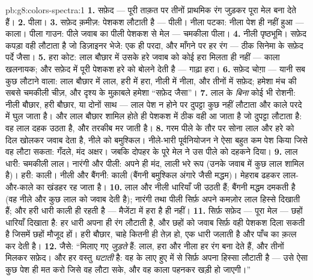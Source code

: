 \begin{solution}{pb:g8:colors-spectra:1}
\textbf{1.} सफ़ेद --- पूरी ताक़त पर तीनों प्राथमिक रंग जुड़कर पूरा मेल
बना देते हैं।
\textbf{2.} पीला।
\textbf{3.} सफ़ेद क़मीज़: पेशकश लौटाती है --- पीली। नीला पटका: नीला
पेश ही नहीं हुआ --- काला। पीला गाउन: पीले जवाब का पीली पेशकश से मेल
--- चमकीला पीला।
\textbf{4.} नीली पृष्ठभूमि। सफ़ेद कपड़ा वही लौटाता है जो डिज़ाइनर
भेजे: एक ही परदा, और माँगने पर हर रंग --- ठीक सिनेमा के सफ़ेद पर्दे
जैसा।
\textbf{5.} हरा कोट: लाल बौछार में उसके हरे जवाब को कोई हरा मिलता ही
नहीं --- काला खलनायक; और सफ़ेद  में पूरी पेशकश हरे को बोलने देती
है --- गाढ़ा हरा।
\textbf{6.} सफ़ेद चोग़ा --- यानी सब कुछ लौटाने वाला: लाल बौछार में
लाल, हरी में हरा, नीली में नीला, और तीनों में सफ़ेद; हमेशा मंच की सबसे
चमकीली चीज़, और दृश्य के मुक़ाबले हमेशा ``सफ़ेद जैसा''।
\textbf{7.} लाल के \emph{बिना} कोई भी रोशनी: नीली बौछार, हरी बौछार,
या दोनों साथ --- लाल पेश न होने पर दुपट्टा कुछ नहीं लौटाता और काले
परदे में घुल जाता है। और लाल बौछार शामिल होते ही पेशकश में ठीक वही आ
जाता है जो दुपट्टा लौटाता है: वह लाल दहक उठता है, और तरकीब मर जाती है।
\textbf{8.} गरम पीले के तौर पर सोना लाल और हरे को दिल खोलकर जवाब देता
है, नीले को बमुश्किल। नीले-भारी पूर्वनियोजन ने ऐसा बहुत कम पेश किया
जिसे वह लौटा सकता: गँदले, मंद अक्षर। जबकि दोपहर के पूरे मेल ने उस पीले
को दहकने दिया।
\textbf{9.} लाल धारी: चमकीली लाल। नारंगी और पीली: अपने ही मंद, लाली
भरे रूप (उनके जवाब में कुछ लाल शामिल है)। हरी: काली। नीली और बैंगनी:
काली (बैंगनी बमुश्किल अंगारे जैसी मद्धम)। मेहराब ढहकर लाल-और-काले का
खंडहर रह जाता है।
\textbf{10.} लाल और नीली धारियाँ जी उठती हैं; बैंगनी मद्धम दमकती है
(वह नीले और कुछ लाल को जवाब देती है); नारंगी तथा पीली सिर्फ़ अपने
कमज़ोर लाल हिस्से दिखाती हैं; और हरी धारी काली ही रहती है --- मैजेंटा
 में हरा है ही नहीं।
\textbf{11.} सिर्फ़ सफ़ेद  --- पूरा मेल --- छहों धारियाँ
दिखाता है: हर धारी अपना ही रंग लौटाती है, और छहों को जवाब सिर्फ़ वही
पेशकश दिला सकती है जिसमें छहों मौजूद हों। हरी बौछार, चाहे कितनी ही
तेज़ हो, एक धारी जलाती है और पाँच का क़त्ल कर देती है।
\textbf{12.} जैसे: ``मिलाए गए  \emph{जुड़ते} हैं: लाल, हरा और
नीला हर रंग बना देते हैं, और तीनों मिलकर सफ़ेद। और हर वस्तु
\emph{घटाती} है: वह  के लाए हुए में से सिर्फ़ अपना हिस्सा लौटाती
है --- उसे ऐसा कुछ पेश ही मत करो जिसे वह लौटा सके, और वह काला पहनकर
खड़ी हो जाएगी।''
\end{solution}
